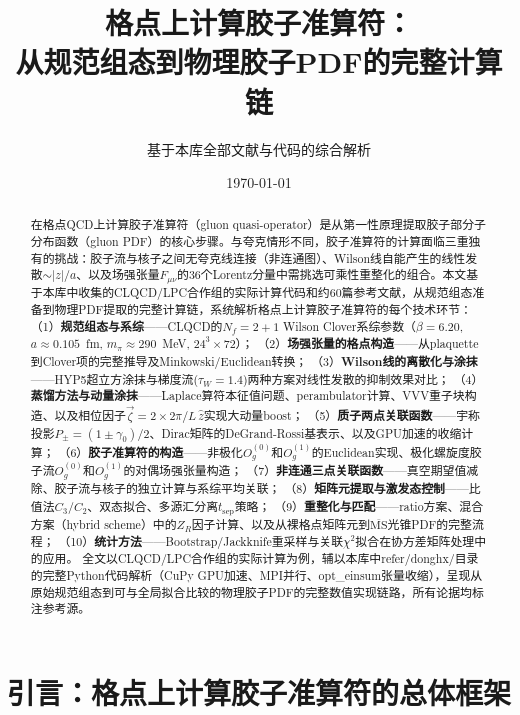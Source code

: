 \documentclass[12pt,a4paper]{ctexart}
\title{\heiti 格点上计算胶子准算符：\\
从规范组态到物理胶子PDF的完整计算链}
\author{基于本库全部文献与代码的综合解析}
\date{\today}
\theoremstyle{definition}
\begin{document}
\maketitle

\begin{abstract}
\noindent
在格点QCD上计算胶子准算符（gluon quasi-operator）是从第一性原理提取胶子部分子分布函数（gluon PDF）的核心步骤。与夸克情形不同，胶子准算符的计算面临三重独有的挑战：胶子流与核子之间无夸克线连接（非连通图）、Wilson线自能产生的线性发散$\sim|z|/a$、以及场强张量$F_{\mu\nu}$的36个Lorentz分量中需挑选可乘性重整化的组合。本文基于本库中收集的CLQCD/LPC合作组的实际计算代码和约60篇参考文献，从规范组态准备到物理PDF提取的完整计算链，系统解析格点上计算胶子准算符的每个技术环节：
（1）\textbf{规范组态与系综}——CLQCD的$N_f=2+1$ Wilson Clover系综参数（$\beta=6.20$, $a\approx0.105$~fm, $m_\pi\approx290$~MeV, $24^3\times72$）；
（2）\textbf{场强张量的格点构造}——从plaquette到Clover项的完整推导及Minkowski/Euclidean转换；
（3）\textbf{Wilson线的离散化与涂抹}——HYP5超立方涂抹与梯度流($\tau_W=1.4$)两种方案对线性发散的抑制效果对比；
（4）\textbf{蒸馏方法与动量涂抹}——Laplace算符本征值问题、perambulator计算、VVV重子块构造、以及相位因子$\vec{\zeta}=2\times 2\pi/L\,\hat{z}$实现大动量boost；
（5）\textbf{质子两点关联函数}——宇称投影$P_\pm=(1\pm\gamma_0)/2$、Dirac矩阵的DeGrand-Rossi基表示、以及GPU加速的收缩计算；
（6）\textbf{胶子准算符的构造}——非极化$O^{(0)}_g$和$O^{(1)}_g$的Euclidean实现、极化螺旋度胶子流$O^{(0)}_g$和$O^{(1)}_g$的对偶场强张量构造；
（7）\textbf{非连通三点关联函数}——真空期望值减除、胶子流与核子的独立计算与系综平均关联；
（8）\textbf{矩阵元提取与激发态控制}——比值法$C_3/C_2$、双态拟合、多源汇分离$t_{\text{sep}}$策略；
（9）\textbf{重整化与匹配}——ratio方案、混合方案（hybrid scheme）中的$Z_R$因子计算、以及从裸格点矩阵元到$\overline{\text{MS}}$光锥PDF的完整流程；
（10）\textbf{统计方法}——Bootstrap/Jackknife重采样与关联$\chi^2$拟合在协方差矩阵处理中的应用。
全文以CLQCD/LPC合作组的实际计算为例，辅以本库中refer/donghx/目录的完整Python代码解析（CuPy GPU加速、MPI并行、opt\_einsum张量收缩），呈现从原始规范组态到可与全局拟合比较的物理胶子PDF的完整数值实现链路，所有论据均标注参考源。
\end{abstract}

\tableofcontents
\newpage

\section{引言：格点上计算胶子准算符的总体框架}
\end{document}
